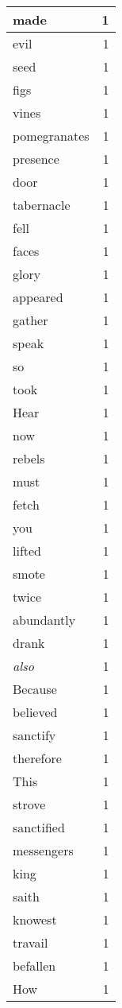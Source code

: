 \begin{center}
\begin{longtable}{l|r}
made & 1 \\ \hline
evil & 1 \\ \hline
seed & 1 \\ \hline
figs & 1 \\ \hline
vines & 1 \\ \hline
pomegranates & 1 \\ \hline
presence & 1 \\ \hline
door & 1 \\ \hline
tabernacle & 1 \\ \hline
fell & 1 \\ \hline
faces & 1 \\ \hline
glory & 1 \\ \hline
appeared & 1 \\ \hline
gather & 1 \\ \hline
speak & 1 \\ \hline
so & 1 \\ \hline
took & 1 \\ \hline
Hear & 1 \\ \hline
now & 1 \\ \hline
rebels & 1 \\ \hline
must & 1 \\ \hline
fetch & 1 \\ \hline
you & 1 \\ \hline
lifted & 1 \\ \hline
smote & 1 \\ \hline
twice & 1 \\ \hline
abundantly & 1 \\ \hline
drank & 1 \\ \hline
\emph{also} & 1 \\ \hline
Because & 1 \\ \hline
believed & 1 \\ \hline
sanctify & 1 \\ \hline
therefore & 1 \\ \hline
This & 1 \\ \hline
strove & 1 \\ \hline
sanctified & 1 \\ \hline
messengers & 1 \\ \hline
king & 1 \\ \hline
saith & 1 \\ \hline
knowest & 1 \\ \hline
travail & 1 \\ \hline
befallen & 1 \\ \hline
How & 1 \\ \hline

\end{longtable}
\end{center}
